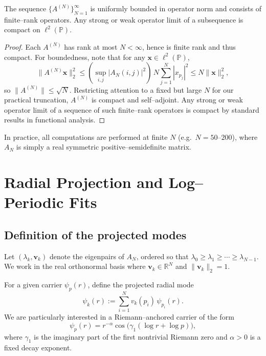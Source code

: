 \documentclass[11pt]{article}
\begin{document}
\begin{proposition}
The sequence $\{A^{(N)}\}_{N=1}^\infty$ is uniformly bounded in operator norm and consists of finite--rank operators. Any strong or weak operator limit of a subsequence is compact on $\ell^2(\mathbb{P})$.
\end{proposition}

\begin{proof}
Each $A^{(N)}$ has rank at most $N < \infty$, hence is finite rank and thus compact. For boundedness, note that for any $\bm{x}\in \ell^2(\mathbb{P})$,
\[
\|A^{(N)}\bm{x}\|_2^2
\leq \left(\sup_{i,j} |A_N(i,j)|^2 \right)\, N \sum_{j=1}^N |x_{p_j}|^2
\leq N \|\bm{x}\|_2^2,
\]
so $\|A^{(N)}\|\leq \sqrt{N}$. Restricting attention to a fixed but large $N$ for our practical truncation, $A^{(N)}$ is compact and self--adjoint. Any strong or weak operator limit of a sequence of such finite--rank operators is compact by standard results in functional analysis.
\end{proof}

In practice, all computations are performed at finite $N$ (e.g.\ $N=50$--$200$), where $A_N$ is simply a real symmetric positive--semidefinite matrix.

\section{Radial Projection and Log--Periodic Fits}

\subsection{Definition of the projected modes}

Let $(\lambda_k,\bm{v}_k)$ denote the eigenpairs of $A_N$, ordered so that $\lambda_0\geq\lambda_1\geq\cdots\geq\lambda_{N-1}$. We work in the real orthonormal basis where $\bm{v}_k\in\mathbb{R}^N$ and $\|\bm{v}_k\|_2 = 1$.

For a given carrier $\psi_p(r)$, define the projected radial mode
\begin{equation}
\psi_k(r) := \sum_{i=1}^N v_k(p_i)\,\psi_{p_i}(r).
\end{equation}
We are particularly interested in a Riemann--anchored carrier of the form
\begin{equation}
\psi_p(r) = r^{-\alpha}\cos\big(\gamma_1(\log r + \log p)\big),
\end{equation}
where $\gamma_1$ is the imaginary part of the first nontrivial Riemann zero and $\alpha>0$ is a fixed decay exponent.
\end{document}
